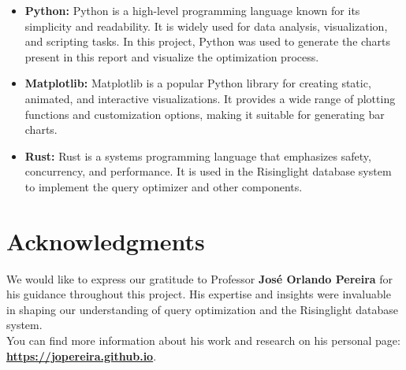\documentclass[a4paper,12pt]{scrreprt}
\renewcommand{\headrulewidth}{0pt} %
\begin{document}
\begin{itemize}
    \item \textbf{Python:} Python is a high-level programming language known for its simplicity and readability. It is widely used for data analysis, visualization, and scripting tasks. In this project, Python was used to generate the charts present in this report and visualize the optimization process.
    \item \textbf{Matplotlib:} Matplotlib is a popular Python library for creating static, animated, and interactive visualizations. It provides a wide range of plotting functions and customization options, making it suitable for generating bar charts.
    \item \textbf{Rust:} Rust is a systems programming language that emphasizes safety, concurrency, and performance. It is used in the Risinglight database system to implement the query optimizer and other components.
\end{itemize}

\section{Acknowledgments}
We would like to express our gratitude to Professor \textbf{José Orlando Pereira} for his guidance throughout this project. His expertise and insights were invaluable in shaping our understanding of query optimization and the Risinglight database system. \\
You can find more information about his work and research on his personal page:\\
\textbf{ \href{https://jopereira.github.io}{https://jopereira.github.io}}. \\



\renewcommand{\headrulewidth}{0pt}
\end{document}

